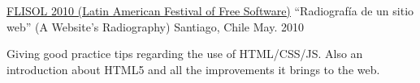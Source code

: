 \begin{cventries}
  \cventry
    {\href{http://santiago.flisol.cl/}{\underline{FLISOL 2010 (Latin American Festival of Free Software)}}} %
    {“Radiografía de un sitio web” (A Website's Radiography)} %
    {Santiago, Chile} %
    {May. 2010} %
    {
      \begin{cvitems} %
        \item {
          Giving good practice tips regarding the use of HTML/CSS/JS. Also an introduction about HTML5 and all the improvements it brings to the web.
        }
      \end{cvitems}
    }

\end{cventries}
